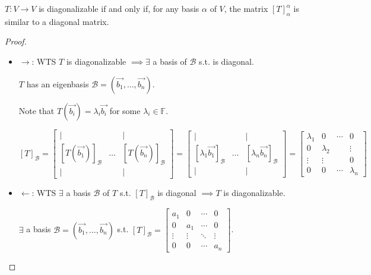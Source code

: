 \documentclass[11pt,fleqn]{book} %
\begin{document}
\setcounter{dummy}{1}
\begin{proposition}
    $T: V \to V$ is diagonalizable if and only if, for any basis $\alpha$ of $V$, the matrix $[T]_\alpha^\alpha$ is similar to a diagonal matrix.
\end{proposition}
\setcounter{chapter}{3}

\begin{proof}
{~~~}

    \begin{itemize}
        \item $\rightarrow$: WTS $T$ is diagonalizable $\implies \exists$ a basis  of $\mathcal{B}$ s.t.  is diagonal.
         
        $T$ has an eigenbasis $\mathcal{B} = (\overrightarrow{b_1}, \dots, \overrightarrow{b_n})$. 
    
        Note that $T(\overrightarrow{b_i}) = \lambda_i \overrightarrow{b_i}$ for some $\lambda_i \in \mathbb{F}$. 
        
        $[T]_\mathcal{B} = \begin{bmatrix} | & &| \\ [T(\overrightarrow{b_1})]_\mathcal{B} &\dots &[T(\overrightarrow{b_n})]_\mathcal{B} \\ | & &| \end{bmatrix} = \begin{bmatrix} | & &| \\ [\lambda_1\overrightarrow{b_1}]_\mathcal{B} &\dots &[\lambda_n\overrightarrow{b_n}]_\mathcal{B} \\ | & &| \end{bmatrix} = \begin{bmatrix} \lambda_1 &0 &\cdots &0 \\ 0 &\lambda_2 & &\vdots \\ \vdots &\vdots & &0 \\ 0 &0 &\cdots &\lambda_n  \end{bmatrix}$

        \item $\leftarrow$: WTS $\exists$ a basis $\mathcal{B}$ of $T$ s.t. $[T]_\mathcal{B}$ is diagonal $\implies T$ is diagonalizable.
        
        $\exists$ a basis $\mathcal{B} = (\overrightarrow{b_1}, \dots, \overrightarrow{b_n})$ s.t. $[T]_\mathcal{B} = \begin{bmatrix} a_1 &0 &\cdots &0 \\ 0 &a_1 &\cdots &0 \\ \vdots &\vdots &\ddots &\vdots \\ 0 &0 &\cdots &a_n \end{bmatrix}$. 


\end{itemize}
\end{proof}
\end{document}
